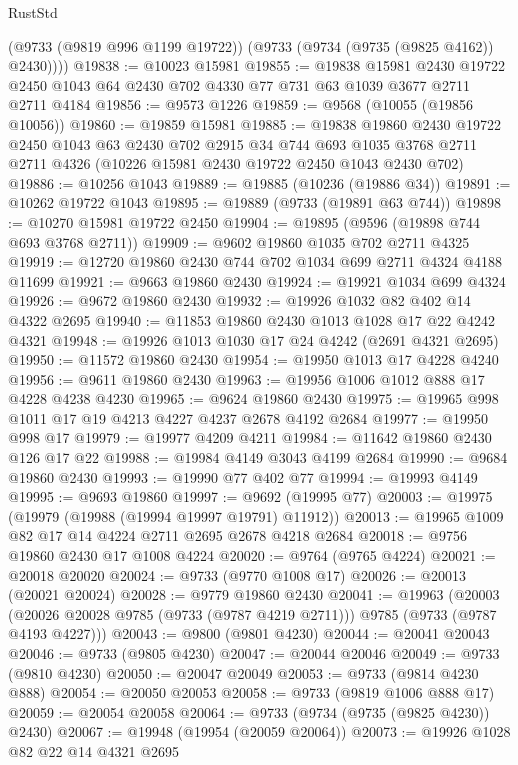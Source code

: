 \begin{lexlean}{RustStd}
\begin{coremodule}
        (@9733 (@9819 @996 @1199 @19722))
        (@9733 (@9734 (@9735 (@9825 @4162)) @2430))))
@19838 := @10023 @15981
@19855 := @19838
    @15981
    @2430
    @19722
    @2450
    @1043
    @64
    @2430
    @702
    @4330
    @77
    @731
    @63
    @1039
    @3677
    @2711
    @2711
    @4184
@19856 := @9573 @1226
@19859 := @9568 (@10055 (@19856 @10056))
@19860 := @19859 @15981
@19885 := @19838
    @19860
    @2430
    @19722
    @2450
    @1043
    @63
    @2430
    @702
    @2915
    @34
    @744
    @693
    @1035
    @3768
    @2711
    @2711
    @4326
    (@10226 @15981 @2430 @19722 @2450 @1043 @2430 @702)
@19886 := @10256 @1043
@19889 := @19885 (@10236 (@19886 @34))
@19891 := @10262 @19722 @1043
@19895 := @19889 (@9733 (@19891 @63 @744))
@19898 := @10270 @15981 @19722 @2450
@19904 := @19895 (@9596 (@19898 @744 @693 @3768 @2711))
@19909 := @9602 @19860 @1035 @702 @2711 @4325
@19919 := @12720 @19860 @2430 @744 @702 @1034 @699 @2711 @4324 @4188 @11699
@19921 := @9663 @19860 @2430
@19924 := @19921 @1034 @699 @4324
@19926 := @9672 @19860 @2430
@19932 := @19926 @1032 @82 @402 @14 @4322 @2695
@19940 := @11853 @19860 @2430 @1013 @1028 @17 @22 @4242 @4321
@19948 := @19926 @1013 @1030 @17 @24 @4242 (@2691 @4321 @2695)
@19950 := @11572 @19860 @2430
@19954 := @19950 @1013 @17 @4228 @4240
@19956 := @9611 @19860 @2430
@19963 := @19956 @1006 @1012 @888 @17 @4228 @4238 @4230
@19965 := @9624 @19860 @2430
@19975 := @19965 @998 @1011 @17 @19 @4213 @4227 @4237 @2678 @4192 @2684
@19977 := @19950 @998 @17
@19979 := @19977 @4209 @4211
@19984 := @11642 @19860 @2430 @126 @17 @22
@19988 := @19984 @4149 @3043 @4199 @2684
@19990 := @9684 @19860 @2430
@19993 := @19990 @77 @402 @77
@19994 := @19993 @4149
@19995 := @9693 @19860
@19997 := @9692 (@19995 @77)
@20003 := @19975 (@19979 (@19988 (@19994 @19997 @19791) @11912))
@20013 := @19965 @1009 @82 @17 @14 @4224 @2711 @2695 @2678 @4218 @2684
@20018 := @9756 @19860 @2430 @17 @1008 @4224
@20020 := @9764 (@9765 @4224)
@20021 := @20018 @20020
@20024 := @9733 (@9770 @1008 @17)
@20026 := @20013 (@20021 @20024)
@20028 := @9779 @19860 @2430
@20041 := @19963
    (@20003 (@20026 @20028 @9785 (@9733 (@9787 @4219 @2711))) @9785 (@9733 (@9787 @4193 @4227)))
@20043 := @9800 (@9801 @4230)
@20044 := @20041 @20043
@20046 := @9733 (@9805 @4230)
@20047 := @20044 @20046
@20049 := @9733 (@9810 @4230)
@20050 := @20047 @20049
@20053 := @9733 (@9814 @4230 @888)
@20054 := @20050 @20053
@20058 := @9733 (@9819 @1006 @888 @17)
@20059 := @20054 @20058
@20064 := @9733 (@9734 (@9735 (@9825 @4230)) @2430)
@20067 := @19948 (@19954 (@20059 @20064))
@20073 := @19926 @1028 @82 @22 @14 @4321 @2695

\end{coremodule}
\end{lexlean}
